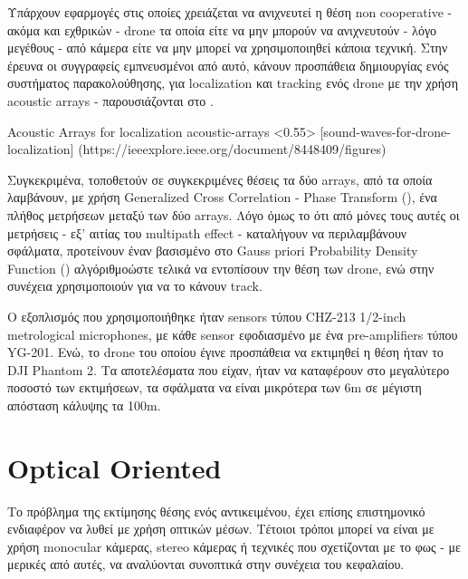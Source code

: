 Υπάρχουν εφαρμογές στις οποίες χρειάζεται να ανιχνευτεί η θέση non cooperative - ακόμα και εχθρικών - drone τα οποία είτε να μην μπορούν να ανιχνευτούν - λόγο μεγέθους - από κάμερα είτε να μην μπορεί να χρησιμοποιηθεί κάποια  τεχνική.
Στην έ\-ρ\-ευ\-να \cite{sound-waves-for-drone-localization} οι συγγραφείς εμπνευσμένοι από αυτό, κάνουν προσπάθεια δημιουργίας ενός συστήματος παρακολούθησης, για localization και tracking ενός drone με την χρήση acoustic arrays - παρουσιάζονται στο . 

%
{Acoustic Arrays for localization}%
{acoustic-arrays}%
<0.55>%
[sound-waves-for-drone-localization]%
(https://ieeexplore.ieee.org/document/8448409/figures)

Συγκεκριμένα, τοποθετούν σε συγκεκριμένες θέσεις τα δύο arrays, από τα οποία λα\-μβά\-νουν, με χρήση Generalized Cross Correlation - Phase Transform (), ένα πλήθος μετρήσεων  μεταξύ των δύο arrays. Λόγο όμως το ότι από μόνες τους αυτές οι
μετρήσεις - εξ' αιτίας του multipath effect - καταλήγουν να περιλαμβάνουν σφάλματα, προτείνουν έναν βασισμένο στο Gauss
priori Probability Density Function () αλγόριθμο\udot ώστε τελικά να εντοπίσουν την θέση των drone, ενώ στην συνέχεια χρησιμοποιούν  για να το κάνουν track.

Ο εξοπλισμός που χρησιμοποιήθηκε ήταν sensors τύπου CHZ-213 1/2-inch me\-tro\-lo\-gi\-cal microphones, με κάθε sensor εφοδιασμένο με ένα pre-amplifiers τύπου YG-201. Ενώ, το drone του οποίου έγινε προσπάθεια να εκτιμηθεί η θέση ήταν το DJI Pha\-ntom 2. Τα αποτελέσματα που είχαν, ήταν να καταφέρουν στο μεγαλύτερο ποσοστό των εκτιμήσεων, τα σφάλματα να είναι μικρότερα των 6m σε μέγιστη απόσταση κάλυψης τα 100m.  

\section{Optical Oriented} \label{sec:related-optical}
Το πρόβλημα της εκτίμησης θέσης ενός αντικειμένου, έχει επίσης επιστημονικό ε\-νδια\-φέ\-ρον να λυθεί με χρήση οπτικών μέσων. Τέτοιοι τρόποι μπορεί να είναι με χρήση mo\-no\-cu\-lar κάμερας, stereo κάμερας ή τεχνικές που σχετίζονται με το φως - με μερικές από αυτές, να αναλύονται συνοπτικά στην συνέχεια του κεφαλαίου.

